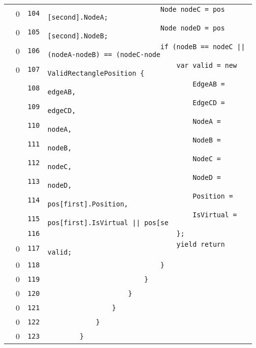 \documentclass[a4paper,10pt]{article}
\begin{document}
\begin{longtable}[l]{lrrl}
\cellcolor{red} & 0 & \verb~104~ & \verb~                            Node nodeC = pos [second].NodeA;~\\
\cellcolor{red} & 0 & \verb~105~ & \verb~                            Node nodeD = pos [second].NodeB;~\\
\cellcolor{red} & 0 & \verb~106~ & \verb~                            if (nodeB == nodeC || (nodeA-nodeB) == (nodeC-node~\\
\cellcolor{red} & 0 & \verb~107~ & \verb~                                var valid = new ValidRectanglePosition {~\\
\cellcolor{gray} &  & \verb~108~ & \verb~                                    EdgeAB = edgeAB,~\\
\cellcolor{gray} &  & \verb~109~ & \verb~                                    EdgeCD = edgeCD,~\\
\cellcolor{gray} &  & \verb~110~ & \verb~                                    NodeA = nodeA,~\\
\cellcolor{gray} &  & \verb~111~ & \verb~                                    NodeB = nodeB,~\\
\cellcolor{gray} &  & \verb~112~ & \verb~                                    NodeC = nodeC,~\\
\cellcolor{gray} &  & \verb~113~ & \verb~                                    NodeD = nodeD,~\\
\cellcolor{gray} &  & \verb~114~ & \verb~                                    Position = pos[first].Position,~\\
\cellcolor{gray} &  & \verb~115~ & \verb~                                    IsVirtual = pos[first].IsVirtual || pos[se~\\
\cellcolor{gray} &  & \verb~116~ & \verb~                                };~\\
\cellcolor{red} & 0 & \verb~117~ & \verb~                                yield return valid;~\\
\cellcolor{red} & 0 & \verb~118~ & \verb~                            }~\\
\cellcolor{red} & 0 & \verb~119~ & \verb~                        }~\\
\cellcolor{red} & 0 & \verb~120~ & \verb~                    }~\\
\cellcolor{red} & 0 & \verb~121~ & \verb~                }~\\
\cellcolor{red} & 0 & \verb~122~ & \verb~            }~\\
\cellcolor{red} & 0 & \verb~123~ & \verb~        }~\\

\end{longtable}
\end{document}
